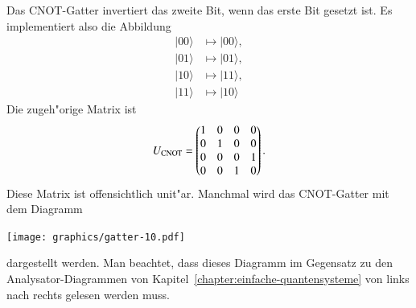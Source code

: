 \begin{beispiel}
Das \textsc{CNOT}-Gatter invertiert das zweite Bit, wenn das erste Bit
gesetzt ist.
Es implementiert also die Abbildung
\begin{align*}
|00\rangle&\mapsto|00\rangle,\\
|01\rangle&\mapsto|01\rangle,\\
|10\rangle&\mapsto|11\rangle,\\
|11\rangle&\mapsto|10\rangle
\end{align*}
Die zugeh"orige Matrix ist
\[
U_{\textsc{CNOT}}=\begin{pmatrix}
1&0&0&0\\
0&1&0&0\\
0&0&0&1\\
0&0&1&0
\end{pmatrix}.
\]
Diese Matrix ist offensichtlich unit"ar.
Manchmal wird das \textsc{CNOT}-Gatter mit dem Diagramm
\begin{center}
\texttt{[image: graphics/gatter-10.pdf]}
\end{center}
dargestellt werden.
Man beachtet, dass dieses Diagramm im Gegensatz zu den Analysator-Diagrammen
von Kapitel~\ref{chapter:einfache-quantensysteme} von links nach rechts
gelesen werden muss.
\end{beispiel}

